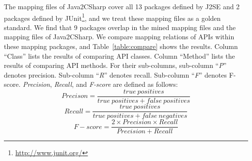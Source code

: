 The mapping files of Java2CSharp cover all 13 packages defined by
J2SE and 2 packages defined by
JUnit\footnote{\url{http://www.junit.org/}}, and we treat these
mapping files as a golden standard. We find that 9 packages overlap
in the mined mapping files and the mapping files of Java2CSharp. We
compare mapping relations of APIs within these mapping packages, and
Table~\ref{table:compare} shows the results. Column ``Class'' lists
the results of comparing API classes. Column ``Method'' lists the
results of comparing API methods. For their sub-columns, sub-column
``\emph{P}'' denotes precision. Sub-column ``\emph{R}'' denotes
recall. Sub-column ``\emph{F}'' denotes F-score. \emph{Precision},
\emph{Recall}, and \emph{F-score} are defined as follows:
\begin{equation}\label{eq-precison}
Precison=\frac{true\ positives}{true\ positives+false\ positives}
\end{equation}
\begin{equation}\label{eq-recall}
Recall=\frac{true\ positives}{true\ positives+false\ negatives}
\end{equation}
\begin{equation}\label{eq-fscore}
F\!-\!score=\frac{2\times Precision \times Recall}{Precision+Recall}
\end{equation}

